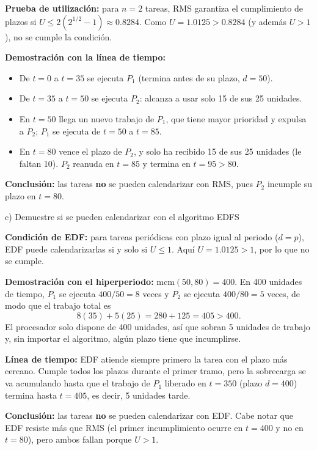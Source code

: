 \documentclass[a4paper, 11pt]{article}
\newcommand{\Aspace}{0.2cm}
\begin{document}
\begin{enumerate}
{        \textbf{Prueba de utilización:} para $n=2$ tareas, RMS garantiza el cumplimiento de plazos si $U \le 2\left(2^{1/2}-1\right) \approx 0.8284$. Como $U = 1.0125 > 0.8284$ (y además $U>1$), no se cumple la condición.

        \textbf{Demostración con la línea de tiempo:}
        \begin{itemize}
            \item De $t=0$ a $t=35$ se ejecuta $P_1$ (termina antes de su plazo, $d=50$).
            \item De $t=35$ a $t=50$ se ejecuta $P_2$: alcanza a usar solo 15 de sus 25 unidades.
            \item En $t=50$ llega un nuevo trabajo de $P_1$, que tiene mayor prioridad y expulsa a $P_2$; $P_1$ se ejecuta de $t=50$ a $t=85$.
            \item En $t=80$ vence el plazo de $P_2$, y solo ha recibido 15 de sus 25 unidades (le faltan 10). $P_2$ reanuda en $t=85$ y termina en $t=95>80$.
        \end{itemize}
        \textbf{Conclusión:} las tareas \textbf{no} se pueden calendarizar con RMS, pues $P_2$ incumple su plazo en $t=80$.
        }
        
        \newpage
        \vspace{\Aspace} \par
        c) Demuestre si se pueden calendarizar con el algoritmo EDFS
        \par { \color{azul} 
        \textbf{Condición de EDF:} para tareas periódicas con plazo igual al periodo ($d=p$), EDF puede calendarizarlas si y solo si $U \le 1$. Aquí $U = 1.0125 > 1$, por lo que no se cumple.

        \textbf{Demostración con el hiperperiodo:} $\mathrm{mcm}(50,80)=400$. En 400 unidades de tiempo, $P_1$ se ejecuta $400/50=8$ veces y $P_2$ se ejecuta $400/80=5$ veces, de modo que el trabajo total es
        \[
            8(35) + 5(25) = 280 + 125 = 405 > 400 .
        \]
        El procesador solo dispone de 400 unidades, así que sobran 5 unidades de trabajo y, sin importar el algoritmo, algún plazo tiene que incumplirse.

        \textbf{Línea de tiempo:} EDF atiende siempre primero la tarea con el plazo más cercano. Cumple todos los plazos durante el primer tramo, pero la sobrecarga se va acumulando hasta que el trabajo de $P_1$ liberado en $t=350$ (plazo $d=400$) termina hasta $t=405$, es decir, 5 unidades tarde.

        \textbf{Conclusión:} las tareas \textbf{no} se pueden calendarizar con EDF. Cabe notar que EDF resiste más que RMS (el primer incumplimiento ocurre en $t=400$ y no en $t=80$), pero ambos fallan porque $U>1$.

}
\end{enumerate}
\end{document}
